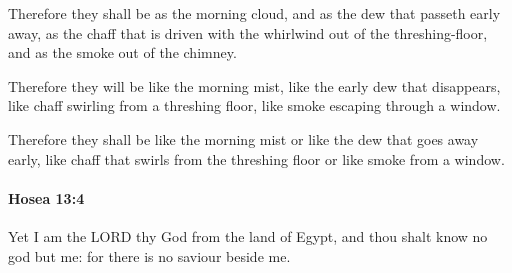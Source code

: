 			\begin{versebox}
					\item[BHS] 
					\item[LXX] 
					\item[ASV] Therefore they shall be as the morning cloud, and as the dew that passeth early away, as the chaff that is driven with the whirlwind out of the threshing-floor, and as the smoke out of the chimney.
					\item[NIV] Therefore they will be like the morning mist, like the early dew that disappears, like chaff swirling from a threshing floor, like smoke escaping through a window.
					\item[NRSV] Therefore they shall be like the morning mist or like the dew that goes away early, like chaff that swirls from the threshing floor or like smoke from a window.
			\end{versebox}

		\paragraph{Hosea 13:4} %
			\label{HOSEA-13-4}

			Yet I am the LORD thy God from the land of Egypt, and thou shalt know no god but me: for there is no saviour beside me.

